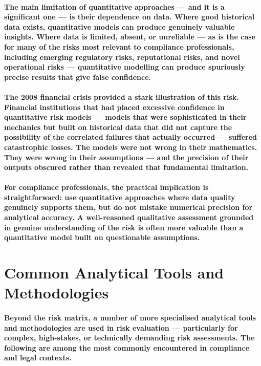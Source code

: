 \paragraph{The main limitation of quantitative approaches — and it is a significant one — is their dependence on data. Where good historical data exists, quantitative models can produce genuinely valuable insights. Where data is limited, absent, or unreliable — as is the case for many of the risks most relevant to compliance professionals, including emerging regulatory risks, reputational risks, and novel operational risks — quantitative modelling can produce spuriously precise results that give false confidence.}
\paragraph{The 2008 financial crisis provided a stark illustration of this risk. Financial institutions that had placed excessive confidence in quantitative risk models — models that were sophisticated in their mechanics but built on historical data that did not capture the possibility of the correlated failures that actually occurred — suffered catastrophic losses. The models were not wrong in their mathematics. They were wrong in their assumptions — and the precision of their outputs obscured rather than revealed that fundamental limitation.}
\paragraph{For compliance professionals, the practical implication is straightforward: use quantitative approaches where data quality genuinely supports them, but do not mistake numerical precision for analytical accuracy. A well-reasoned qualitative assessment grounded in genuine understanding of the risk is often more valuable than a quantitative model built on questionable assumptions.}

\section{Common Analytical Tools and Methodologies}
\paragraph{Beyond the risk matrix, a number of more specialised analytical tools and methodologies are used in risk evaluation — particularly for complex, high-stakes, or technically demanding risk assessments. The following are among the most commonly encountered in compliance and legal contexts.}

